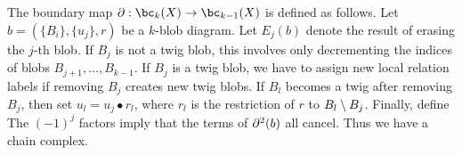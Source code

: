 The boundary map $\bd : \bc_k(X) \to \bc_{k-1}(X)$ is defined as follows.
Let $b = (\{B_i\}, \{u_j\}, r)$ be a $k$-blob diagram.
Let $E_j(b)$ denote the result of erasing the $j$-th blob.
If $B_j$ is not a twig blob, this involves only decrementing
the indices of blobs $B_{j+1},\ldots,B_{k-1}$.
If $B_j$ is a twig blob, we have to assign new local relation labels
if removing $B_j$ creates new twig blobs.
If $B_l$ becomes a twig after removing $B_j$, then set $u_l = u_j\bullet r_l$,
where $r_l$ is the restriction of $r$ to $B_l \setminus B_j$.
Finally, define
The $(-1)^j$ factors imply that the terms of $\partial^2(b)$ all cancel.
Thus we have a chain complex.




